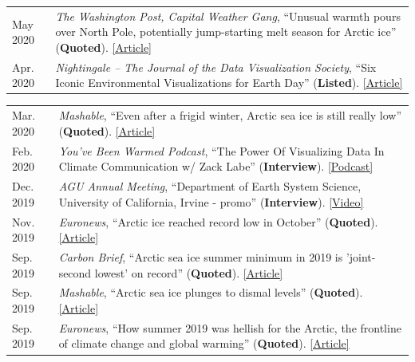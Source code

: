 \documentclass[margin,line,palatino,courier,10pt]{res}
\begin{document}
\begin{resume}
\begin{tabular}{@{}p{0.9in}p{4in}}
May 2020 & \textit{The Washington Post, Capital Weather Gang}, ``Unusual warmth pours over North Pole, potentially jump-starting melt season for Arctic ice'' (\textbf{Quoted}). \href{https://www.washingtonpost.com/weather/2020/05/14/arctic-temperature-spike-sea-ice/}{[Article]}\\
Apr. 2020 & \textit{Nightingale – The Journal of the Data Visualization Society}, ``Six Iconic Environmental Visualizations for Earth Day'' (\textbf{Listed}). \href{https://medium.com/nightingale/six-iconic-environmental-visualizations-for-earth-day-d7a5bdaf177b}{[Article]}\\
\end{tabular}
\begin{tabular}{@{}p{0.9in}p{4in}}
Mar. 2020 & \textit{Mashable}, ``Even after a frigid winter, Arctic sea ice is still really low'' (\textbf{Quoted}). \href{https://mashable.com/article/arctic-sea-ice-low-2020/}{[Article]}\\
Feb. 2020 & \textit{You’ve Been Warmed Podcast}, ``The Power Of Visualizing Data In Climate Communication w/ Zack Labe'' (\textbf{Interview}). \href{https://www.youvebeenwarmed.com/episodes/the-power-of-visualizing-data-in-climate-communication-w-zack-labe}{[Podcast]}\\
Dec. 2019 & \textit{AGU Annual Meeting}, ``Department of Earth System Science, University of California, Irvine - promo'' (\textbf{Interview}). \href{https://www.youtube.com/watch?v=QSDRbSkJeqg&feature=youtu.be}{[Video]}\\
Nov. 2019 & \textit{Euronews}, ``Arctic ice reached record low in October'' (\textbf{Quoted}). \href{https://www.euronews.com/2019/11/04/arctic-ice-reached-record-low-in-october}{[Article]}\\
Sep. 2019 & \textit{Carbon Brief}, ``Arctic sea ice summer minimum in 2019 is 'joint-second lowest' on record'' (\textbf{Quoted}). \href{https://www.carbonbrief.org/arctic-sea-ice-minimum-in-2019-is-joint-second-lowest-on-record}{[Article]}\\
Sep. 2019 & \textit{Mashable}, ``Arctic sea ice plunges to dismal levels'' (\textbf{Quoted}). \href{https://mashable.com/article/arctic-sea-ice-2019-melt/}{[Article]}\\
Sep. 2019 & \textit{Euronews}, ``How summer 2019 was hellish for the Arctic, the frontline of climate change and global warming'' (\textbf{Quoted}). \href{https://www.euronews.com/2019/09/18/how-2019-was-hellish-for-the-arctic-the-frontline-of-climate-change-and-global-warming}{[Article]}\\

\end{tabular}
\end{resume}
\end{document}
